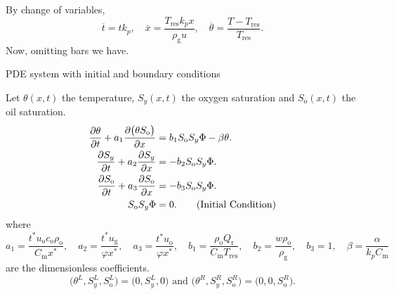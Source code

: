 \documentclass[
    8pt,
    aspectratio=1610,
    c,
    intlimits,
    leqno,
    professionalfonts,
]{beamer}
\begin{document}
\begin{frame}
	\frametitle{\secname}
	By change of variables,
	\begin{equation}
		\overline{t}=
		tk_{p},\quad
		\overline{x}=
		\frac{T_{\text{res}}k_{p}x}{\rho_{\text{g}}u},\quad
		\overline{\theta}=
		\frac{T-T_{\text{res}}}{T_{\text{res}}}.
	\end{equation}
	Now, omitting bars we have.

	\begin{block}{PDE system with initial and boundary
			conditions~\cite{Quispe2020}}

		Let $\theta\left(x,t\right)$ the \alert{temperature},
		$S_{y}\left(x,t\right)$ the \alert{oxygen saturation} and
		$S_{\text{o}}\left(x,t\right)$ the \alert{oil saturation}.
		\begin{align}
			\diffp{\theta}{t}+
			a_{1}
			\diffp{
				\big(
				\theta
				S_{\text{o}}
				\big)
			}{x}                    & =
			b_{1}
			S_{\text{o}}
			S_{y}
			\Phi-
			\beta\theta.
			\label{eq:6}                \\
			\diffp{S_{y}}{t}+
			a_{2}
			\diffp{S_{y}}{x}        & =
			-b_{2}
			S_{\text{o}}
			S_{y}
			\Phi.
			\label{eq:7}                \\
			\diffp{S_{\text{o}}}{t}+
			a_{3}
			\diffp{S_{\text{o}}}{x} & =
			-b_{3}
			S_{\text{o}}
			S_{y}
			\Phi.
			\label{eq:8}                \\
			S_{\text{o}}
			S_{y}
			\Phi                    & =
			0.
			\tag{Initial Condition}
		\end{align}
		where
		\begin{equation}
			a_{1}=
			\frac{
			t^{\ast}
			u_{\text{o}}
			c_{\text{o}}
			\rho_{\text{o}}
			}{C_{\text{m}}x^{\ast}},\quad
			a_{2}=
			\frac{t^{\ast}u_{\text{g}}}{\varphi x^{\ast}},\quad
			a_{3}=
			\frac{t^{\ast}u_{\text{o}}}{\varphi x^{\ast}},\quad
			b_{1}=
			\frac{
				\rho_{\text{o}}
				Q_{\text{r}}
			}{
				C_{\text{m}}
				T_{\text{res}}
			},\quad
			b_{2}=
			\frac{w\rho_{\text{o}}}{\rho_{\text{g}}},\quad
			b_{3}=
			1,\quad
			\beta=
			\frac{\alpha}{k_{p}C_{\text{m}}}
		\end{equation}
		are the dimensionless coefficients.
		\setcounter{equation}{12}
		\begin{equation}
			\big(
			\theta^{L},
			S^{L}_{y},
			S^{L}_{\text{o}}
			\big)=
			\big(
			0,
			S^{L}_{y},
			0
			\big)
			\text{ and }
			\big(
			\theta^{R},
			S^{R}_{y},
			S^{R}_{\text{o}}
			\big)                           =
			\big(
			0,
			0,
			S^{R}_{\text{o}}
			\big).
			\label{eq:13}
		\end{equation}
	\end{block}
\end{frame}
\end{document}
